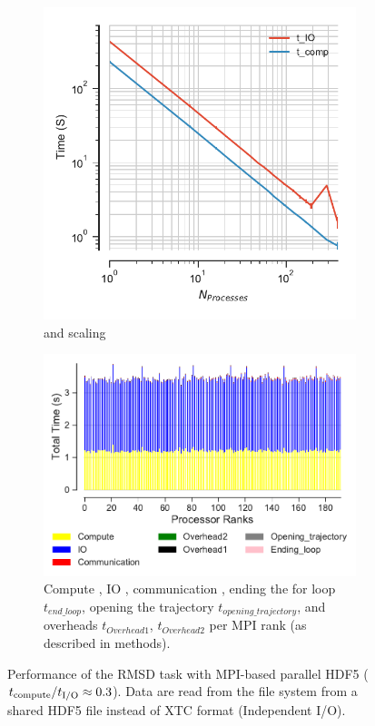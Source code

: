 \begin{figure}[ht!]
\begin{subfigure}{.4\textwidth}
\centering
  \includegraphics[width=\linewidth]{figures/hdf5-time_IO_comparison.pdf}
\caption{\tcomp and \tIO scaling}
\label{fig:ScalingComputeIO-hdf5}
\end{subfigure}
\hfill
\begin{subfigure} {.5\textwidth}
  \includegraphics[width=\linewidth]{figures/hdf5-BarPlot-rank-comparison_192_4.pdf}
  \caption{Compute \tcomp, IO \tIO, communication \tcomm , ending the for loop $t_{end\_loop}$,
  opening the trajectory $t_{opening\_trajectory}$, and overheads $t_{Overhead1}$,  $t_{Overhead2}$ per MPI rank (as described in methods).}
  \label{fig:MPIranks-hdf5}
\end{subfigure}
%
\caption{Performance of the RMSD task with MPI-based parallel HDF5 (${t}_{\text{compute}}/{t}_{\text{I/O}} \approx 0.3$).
Data are read from the file system from a shared HDF5 file instead of XTC format (Independent I/O).}
\label{fig:MPIwithIO-hdf5}
\end{figure}
